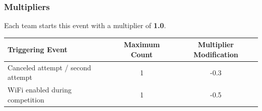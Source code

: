 \subsubsection{Multipliers}
\label{freedrive_multipliers}

Each team starts this event with a multiplier of \textbf{1.0}.

\begin{table}[H]
	\begin{tabular}{@{}lcc@{}}
		\toprule
		\textbf{Triggering Event}         & \textbf{Maximum Count} & \textbf{Multiplier Modification} \\ \midrule
		Canceled attempt / second attempt & 1                      & -0.3                             \\
		WiFi enabled during competition   & 1                      & -0.5                             \\
		\bottomrule
	\end{tabular}
\end{table}